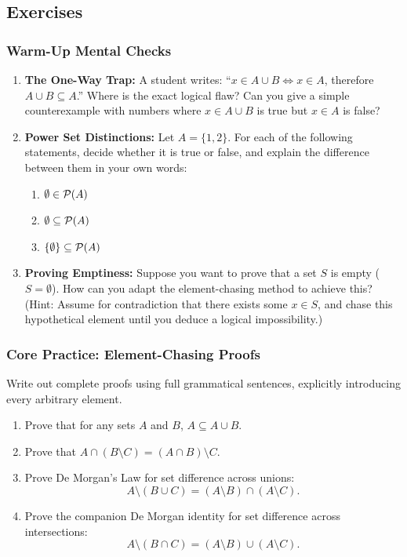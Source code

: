 \subsection{Exercises}

\subsubsection*{Warm-Up Mental Checks}
\begin{enumerate}[label=\arabic*.]
\item \textbf{The One-Way Trap:} A student writes: ``$x \in A \cup B \iff x \in A$, therefore $A \cup B \subseteq A$.'' Where is the exact logical flaw? Can you give a simple counterexample with numbers where $x \in A \cup B$ is true but $x \in A$ is false?
\item \textbf{Power Set Distinctions:} Let $A = \{1, 2\}$. For each of the following statements, decide whether it is true or false, and explain the difference between them in your own words:
\begin{enumerate}[label=(\alph*)]
\item $\emptyset \in \mathcal{P}(A)$
\item $\emptyset \subseteq \mathcal{P}(A)$
\item $\{\emptyset\} \subseteq \mathcal{P}(A)$
\end{enumerate}
\item \textbf{Proving Emptiness:} Suppose you want to prove that a set $S$ is empty ($S = \emptyset$). How can you adapt the element-chasing method to achieve this? (Hint: Assume for contradiction that there exists some $x \in S$, and chase this hypothetical element until you deduce a logical impossibility.)
\end{enumerate}

\subsubsection*{Core Practice: Element-Chasing Proofs}
Write out complete proofs using full grammatical sentences, explicitly introducing every arbitrary element.
\begin{enumerate}[resume*]
\item Prove that for any sets $A$ and $B$, $A \subseteq A \cup B$.
\item Prove that $A \cap (B \setminus C) = (A \cap B) \setminus C$.
\item Prove De Morgan's Law for set difference across unions:
\[
A \setminus (B \cup C) = (A \setminus B) \cap (A \setminus C).
\]
\item Prove the companion De Morgan identity for set difference across intersections:
\[
A \setminus (B \cap C) = (A \setminus B) \cup (A \setminus C).
\]
\end{enumerate}

